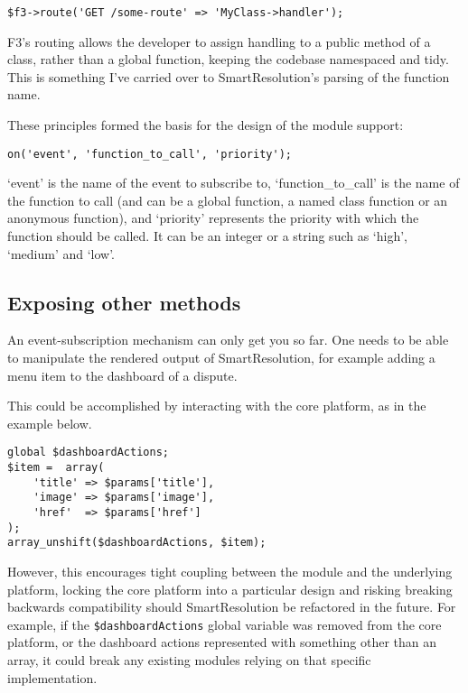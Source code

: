 \begin{lstlisting}
$f3->route('GET /some-route' => 'MyClass->handler');
\end{lstlisting}

F3's routing allows the developer to assign handling to a public method of a class, rather than a global function, keeping the codebase namespaced and tidy. This is something I've carried over to SmartResolution's parsing of the function name.

These principles formed the basis for the design of the module support:

\begin{lstlisting}
on('event', 'function_to_call', 'priority');
\end{lstlisting}

`event' is the name of the event to subscribe to, `function\_to\_call' is the name of the function to call (and can be a global function, a named class function or an anonymous function), and `priority' represents the priority with which the function should be called. It can be an integer or a string such as `high', `medium' and `low'.

\subsection{Exposing other methods}

An event-subscription mechanism can only get you so far. One needs to be able to manipulate the rendered output of SmartResolution, for example adding a menu item to the dashboard of a dispute.

This could be accomplished by interacting with the core platform, as in the example below.

\begin{lstlisting}
global $dashboardActions;
$item =  array(
    'title' => $params['title'],
    'image' => $params['image'],
    'href'  => $params['href']
);
array_unshift($dashboardActions, $item);
\end{lstlisting}

However, this encourages tight coupling between the module and the underlying platform, locking the core platform into a particular design and risking breaking backwards compatibility should SmartResolution be refactored in the future. For example, if the \lstinline{$dashboardActions} global variable was removed from the core platform, or the dashboard actions represented with something other than an array, it could break any existing modules relying on that specific implementation.

